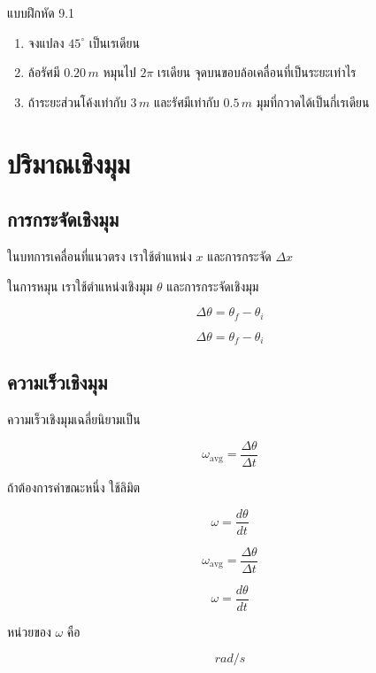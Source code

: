 \begin{exercisebox}{แบบฝึกหัด 9.1}
\begin{enumerate}
    \item จงแปลง $45^\circ$ เป็นเรเดียน
    \item ล้อรัศมี $0.20\,\si{m}$ หมุนไป $2\pi$ เรเดียน จุดบนขอบล้อเคลื่อนที่เป็นระยะเท่าไร
    \item ถ้าระยะส่วนโค้งเท่ากับ $3\,\si{m}$ และรัศมีเท่ากับ $0.5\,\si{m}$ มุมที่กวาดได้เป็นกี่เรเดียน
\end{enumerate}
\end{exercisebox}

\section{ปริมาณเชิงมุม}

\subsection{การกระจัดเชิงมุม}

ในบทการเคลื่อนที่แนวตรง เราใช้ตำแหน่ง $x$ และการกระจัด $\Delta x$

ในการหมุน เราใช้ตำแหน่งเชิงมุม $\theta$ และการกระจัดเชิงมุม

\[
\Delta \theta=\theta_f-\theta_i
\]

\begin{tcolorbox}[title=การกระจัดเชิงมุม]
\[
\Delta \theta=\theta_f-\theta_i
\]
\end{tcolorbox}

\subsection{ความเร็วเชิงมุม}

ความเร็วเชิงมุมเฉลี่ยนิยามเป็น

\[
\omega_{\text{avg}}=\frac{\Delta \theta}{\Delta t}
\]

ถ้าต้องการค่าขณะหนึ่ง ใช้ลิมิต

\[
\omega=\frac{d\theta}{dt}
\]

\begin{tcolorbox}[title=ความเร็วเชิงมุม]
\[
\omega_{\text{avg}}=\frac{\Delta \theta}{\Delta t}
\]

\[
\omega=\frac{d\theta}{dt}
\]
\end{tcolorbox}

หน่วยของ $\omega$ คือ

\[
\si{rad/s}
\]

